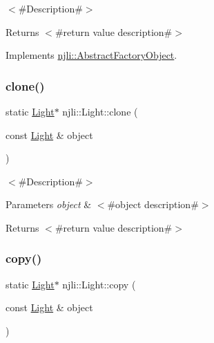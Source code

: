 $<$\#\+Description\#$>$

\begin{DoxyReturn}{Returns}
$<$\#return value description\#$>$ 
\end{DoxyReturn}


Implements \mbox{\hyperlink{classnjli_1_1_abstract_factory_object_a4763d05bc9dc37c559111f8bb30e1dd8}{njli\+::\+Abstract\+Factory\+Object}}.

\mbox{\label{classnjli_1_1_light_a5117da30363b8e8474bf188a9b4afac7}} 
\subsubsection{\texorpdfstring{clone()}{clone()}}
{\footnotesize\ttfamily static \mbox{\hyperlink{classnjli_1_1_light}{Light}}$\ast$ njli\+::\+Light\+::clone (\begin{DoxyParamCaption}\item[{const \mbox{\hyperlink{classnjli_1_1_light}{Light}} \&}]{object }\end{DoxyParamCaption})\hspace{0.3cm}{\ttfamily [static]}}

$<$\#\+Description\#$>$


\begin{DoxyParams}{Parameters}
{\em object} & $<$\#object description\#$>$\\
\hline
\end{DoxyParams}
\begin{DoxyReturn}{Returns}
$<$\#return value description\#$>$ 
\end{DoxyReturn}
\mbox{\label{classnjli_1_1_light_a8396303da432e6fe4d24c92ef7b37d36}} 
\subsubsection{\texorpdfstring{copy()}{copy()}}
{\footnotesize\ttfamily static \mbox{\hyperlink{classnjli_1_1_light}{Light}}$\ast$ njli\+::\+Light\+::copy (\begin{DoxyParamCaption}\item[{const \mbox{\hyperlink{classnjli_1_1_light}{Light}} \&}]{object }\end{DoxyParamCaption})\hspace{0.3cm}{\ttfamily [static]}}

